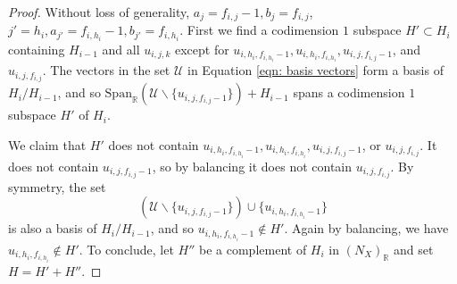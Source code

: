 \documentclass{article}
\def\R{\mathbb{R}}
\begin{document}
\begin{proof}
    Without loss of generality,  $a_j = f_{i,j} -1, b_j = f_{i,j}$, $j' = h_i, a_{j'} = f_{i,h_i}-1, b_{j'} = f_{i,h_i}$. First we find a codimension $1$ subspace $H' \subset H_i$ containing $H_{i-1}$ and all $u_{i,j,k}$ except for $u_{i,h_i, f_{i,h_i}-1}, u_{i,h_i, f_{i,h_i}}, u_{i,j,f_{i,j}-1}$, and $u_{i,j,f_{i,j}}$. The vectors in the set $\mathcal{U}$ in Equation \ref{eqn: basis vectors} form a basis of $H_i/H_{i-1}$, and so $\mathrm{Span}_\R (\mathcal{U} \smallsetminus \{u_{i,j,f_{i,j}-1}\}) +H_{i-1}$ spans a codimension $1$ subspace $H'$ of $H_i$. 
    
    We claim that $H'$ does not contain $u_{i,h_i, f_{i,h_i}-1}, u_{i,h_i, f_{i,h_i}}, u_{i,j,f_{i,j}-1}$, or $u_{i,j,f_{i,j}}$. It does not contain $u_{i,j,f_{i,j}-1}$, so by balancing it does not contain $u_{i,j,f_{i,j}}$. By symmetry, the set
    $$(\mathcal{U} \smallsetminus \{u_{i,j,f_{i,j}-1}\} ) \cup \{u_{i,h_i, f_{i,h_i}-1}\} $$
    is also a basis of $H_i/H_{i-1}$, and so $u_{i,h_i, f_{i,h_i}-1} \notin H'$. Again by balancing, we have $u_{i,h_i,f_{i,h_i}} \notin H'$. To conclude, let $H''$ be a complement of $H_i$ in $(N_X)_{\mathbb{R}}$ and set $H = H' + H''$. 
\end{proof}
\end{document}
